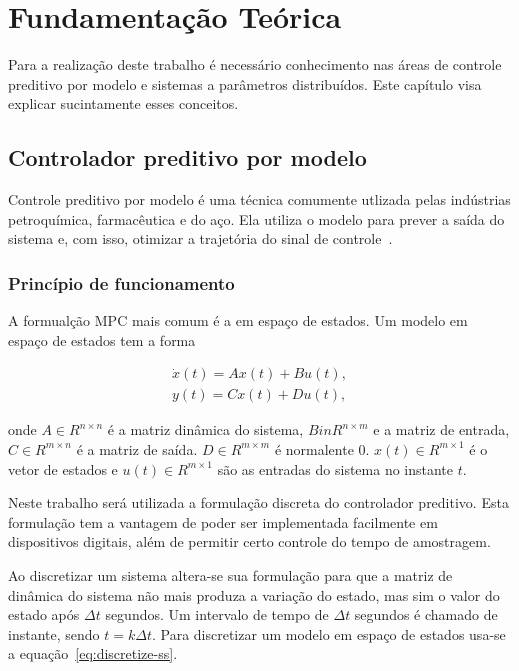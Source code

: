 
\chapter{Fundamentação Teórica}%
\label{chp:foundations}

Para a realização deste trabalho é necessário conhecimento nas áreas de controle
preditivo por modelo e sistemas a parâmetros distribuídos. Este capítulo visa
explicar sucintamente esses conceitos.

\section{Controlador preditivo por modelo}%
\label{sec:mpc}

Controle preditivo por modelo é uma técnica comumente utlizada pelas indústrias
petroquímica, farmacêutica e do aço. Ela utiliza o modelo para prever a saída do
sistema e, com isso, otimizar a trajetória do sinal de
controle~\cite{book:wang}.

\subsection{Princípio de funcionamento}%
\label{subsec:mpc-basic}

A formualção \ac{MPC} mais comum é a em espaço de estados. Um modelo em espaço
de estados tem a forma

\begin{equation}
	\label{eq:ss}
	\begin{split}
		\dot{x}(t) = A x(t) + B u(t), \\
		y(t) = C x(t) + Du(t),
	\end{split}
\end{equation}

onde \( A \in R^{n \times n} \) é a matriz dinâmica do sistema, \( B in R^{n
\times m} \) e a matriz de entrada, \( C \in R^{m \times n} \) é a matriz de
saída. \( D \in R^{m \times m} \) é normalente \( 0 \). \( x(t) \in R^{m \times
1} \) é o vetor de estados e \( u(t) \in R^{m \times 1} \) são as entradas do
sistema no instante \( t \).

Neste trabalho será utilizada a formulação discreta do controlador preditivo.
Esta formulação tem a vantagem de poder ser implementada facilmente em
dispositivos digitais, além de permitir certo controle do tempo de amostragem.

Ao discretizar um sistema altera-se sua formulação para que a matriz de dinâmica
do sistema não mais produza a variação do estado, mas sim o valor do estado após
\( \Delta{}t \) segundos. Um intervalo de tempo de \( \Delta{}t \) segundos é
chamado de instante, sendo \( t = k\Delta{}t \). Para discretizar um modelo em
espaço de estados usa-se a equação~\eqref{eq:discretize-ss}.

